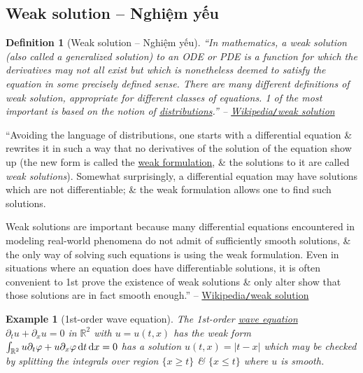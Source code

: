\documentclass{article}
\newtheorem{definition}{Definition}
\newtheorem{example}{Example}
\begin{document}

\subsection{Weak solution -- Nghiệm yếu}

\begin{definition}[Weak solution -- Nghiệm yếu]
	``In mathematics, a \emph{weak solution} (also called a \emph{generalized solution}) to an ODE or PDE is a function for which the derivatives may not all exist but which is nonetheless deemed to satisfy the equation in some precisely defined sense. There are many different definitions of weak solution, appropriate for different classes of equations. 1 of the most important is based on the notion of \href{https://en.wikipedia.org/wiki/Distribution_(mathematics)}{distributions}.'' -- \href{https://en.wikipedia.org/wiki/Weak_solution}{Wikipedia{\tt/}weak solution}
\end{definition}
``Avoiding the language of distributions, one starts with a differential equation \& rewrites it in such a way that no derivatives of the solution of the equation show up (the new form is called the \href{https://en.wikipedia.org/wiki/Weak_formulation}{weak formulation}, \& the solutions to it are called {\it weak solutions}). Somewhat surprisingly, a differential equation may have solutions which are not differentiable; \& the weak formulation allows one to find such solutions.

Weak solutions are important because many differential equations encountered in modeling real-world phenomena do not admit of sufficiently smooth solutions, \& the only way of solving such equations is using the weak formulation. Even in situations where an equation does have differentiable solutions, it is often convenient to 1st prove the existence of weak solutions \& only alter show that those solutions are in fact smooth enough.'' -- \href{https://en.wikipedia.org/wiki/Weak_solution}{Wikipedia{\tt/}weak solution}

\begin{example}[1st-order wave equation]
	The 1st-order \href{https://en.wikipedia.org/wiki/Wave_equation}{wave equation} $\partial_tu + \partial_xu = 0$ in $\mathbb{R}^2$ with $u = u(t,x)$ has the weak form $\int_{\mathbb{R}^2} u\partial_t\varphi + u\partial_x\varphi\,{\rm d}t\,{\rm d}x = 0$ has a solution $u(t,x) = |t - x|$ which may be checked by splitting the integrals over region $\{x\ge t\}$ \& $\{x\le t\}$ where $u$ is smooth.
\end{example}
\end{document}
